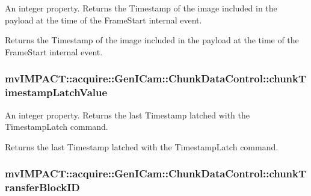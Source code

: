 An integer property. Returns the Timestamp of the image included in the payload at the time of the Frame\+Start internal event. 

Returns the Timestamp of the image included in the payload at the time of the Frame\+Start internal event. \hypertarget{classmv_i_m_p_a_c_t_1_1acquire_1_1_gen_i_cam_1_1_chunk_data_control_aaaa113e713066193edd3549f5a6c0ab5}{
\subsubsection[{chunk\+Timestamp\+Latch\+Value}]{ mv\+I\+M\+P\+A\+C\+T\+::acquire\+::\+Gen\+I\+Cam\+::\+Chunk\+Data\+Control\+::chunk\+Timestamp\+Latch\+Value}}\label{classmv_i_m_p_a_c_t_1_1acquire_1_1_gen_i_cam_1_1_chunk_data_control_aaaa113e713066193edd3549f5a6c0ab5}


An integer property. Returns the last Timestamp latched with the Timestamp\+Latch command. 

Returns the last Timestamp latched with the Timestamp\+Latch command. \hypertarget{classmv_i_m_p_a_c_t_1_1acquire_1_1_gen_i_cam_1_1_chunk_data_control_a43f3d8e2284b6742b8b22186407dce52}{
\subsubsection[{chunk\+Transfer\+Block\+I\+D}]{ mv\+I\+M\+P\+A\+C\+T\+::acquire\+::\+Gen\+I\+Cam\+::\+Chunk\+Data\+Control\+::chunk\+Transfer\+Block\+I\+D}}\label{classmv_i_m_p_a_c_t_1_1acquire_1_1_gen_i_cam_1_1_chunk_data_control_a43f3d8e2284b6742b8b22186407dce52}


